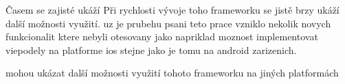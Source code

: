 Časem se zajisté ukáží
Při rychlosti vývoje toho frameworku se jistě brzy ukáží další možnosti využití.
uz je prubehu psani teto prace vzniklo nekolik novych funkcionalit ktere nebyli otesovany jako napriklad moznost
implementovat viepodely na platforme ios stejne jako je tomu na android zarizenich.




mohou ukázat další možnosti využití tohoto frameworku na jiných platformách
